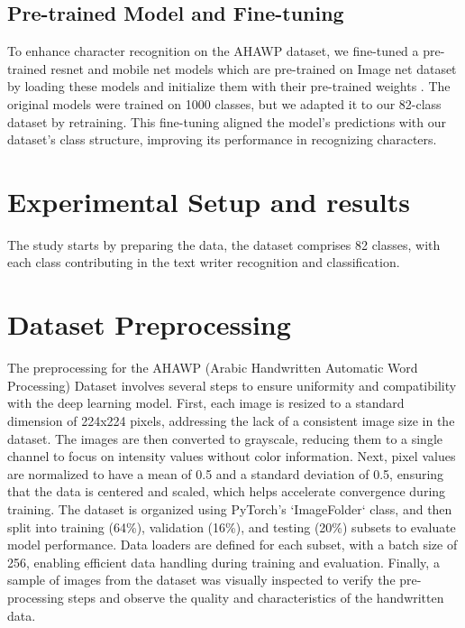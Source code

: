 \documentclass[12pt]{article}
\begin{document}
\subsection{Pre-trained Model and Fine-tuning}
To enhance character recognition on the AHAWP dataset, we fine-tuned a pre-trained resnet and mobile net models which are pre-trained on Image net dataset by loading these models and initialize them with their pre-trained weights . The original models were trained on 1000 classes, but we adapted it to our 82-class dataset by retraining. This fine-tuning aligned the model's predictions with our dataset's class structure, improving its performance in recognizing characters.






\section{Experimental Setup and results }

The study starts by preparing the data, the dataset comprises 82 classes, with each class contributing in the text writer recognition and classification.


\section*{Dataset Preprocessing}
The preprocessing for the AHAWP (Arabic Handwritten Automatic Word Processing) Dataset involves several steps to ensure uniformity and compatibility with the deep learning model. First, each image is resized to a standard dimension of 224x224 pixels, addressing the lack of a consistent image size in the dataset. The images are then converted to grayscale, reducing them to a single channel to focus on intensity values without color information. Next, pixel values are normalized to have a mean of 0.5 and a standard deviation of 0.5, ensuring that the data is centered and scaled, which helps accelerate convergence during training. The dataset is organized using PyTorch's `ImageFolder` class, and then split into training (64\%), validation (16\%), and testing (20\%) subsets to evaluate model performance. Data loaders are defined for each subset, with a batch size of 256, enabling efficient data handling during training and evaluation. Finally, a sample of images from the dataset was visually inspected to verify the pre-processing steps and observe the quality and characteristics of the handwritten data.
\end{document}
